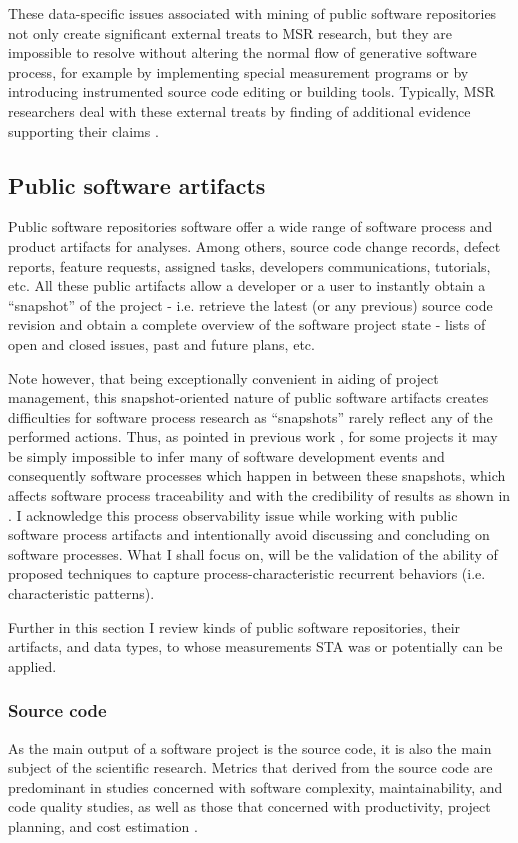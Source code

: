 These data-specific issues associated with mining of public software repositories not only create significant external treats 
to MSR research, but they are impossible to resolve without altering the normal flow of generative software process, 
for example by implementing special measurement programs or by introducing instrumented source code editing or building tools. 
Typically, MSR researchers deal with these external treats by finding of additional evidence supporting their 
claims \cite{citeulike:5043664} \cite{citeulike:5128808}.

\subsection{Public software artifacts}
Public software repositories software offer a wide range of software process and product artifacts for analyses.
Among others, source code change records, defect reports, feature requests, assigned tasks, developers communications, 
tutorials, etc. All these public artifacts allow a developer or a user to instantly obtain a ``snapshot'' of the project - 
i.e. retrieve the latest (or any previous) source code revision and obtain a complete overview of the software project 
state - lists of open and closed issues, past and future plans, etc.

Note however, that being exceptionally convenient in aiding of project management, this snapshot-oriented nature of 
public software artifacts creates difficulties for software process research as ``snapshots'' rarely reflect any of the 
performed actions. 
Thus, as pointed in previous work \cite{citeulike:1296888}, for some projects it may be simply impossible to infer 
many of software development events and consequently software processes which happen in between these snapshots,
which affects software process traceability and with the credibility of results as shown 
in \cite{citeulike:2280690} \cite{citeulike:9037939}. I acknowledge this process observability issue while working with 
public software process artifacts and intentionally avoid discussing and concluding on software processes. 
What I shall focus on, will be the validation of the ability of proposed techniques to capture process-characteristic 
recurrent behaviors (i.e. characteristic patterns).

Further in this section I review kinds of public software repositories, their artifacts, and data types, to whose 
measurements STA was or potentially can be applied. 

\subsubsection{Source code}
As the main output of a software project is the source code, it is also the main subject of the scientific research. 
Metrics that derived from the source code are predominant in studies concerned with software complexity, maintainability,
and code quality studies, as well as those that concerned with productivity, project planning, 
and cost estimation \cite{citeulike:4534888}. 


